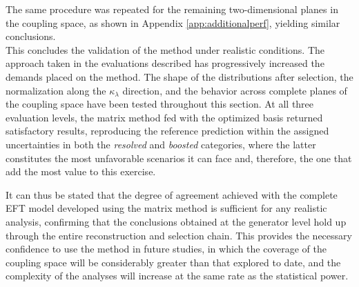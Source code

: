 The same procedure was repeated for the remaining two-dimensional planes in the coupling space, as shown in Appendix \ref{app:additionalperf}, yielding similar conclusions.\\



This concludes the validation of the method under realistic conditions. The approach taken in the evaluations described has progressively increased the demands placed on the method. The shape of the distributions after selection, the normalization along the $\kappa_\lambda$ direction, and the behavior across complete planes of the coupling space have been tested throughout this section. At all three evaluation levels, the matrix method fed with the optimized basis returned satisfactory results, reproducing the reference prediction within the assigned uncertainties in both the \textit{resolved} and \textit{boosted} categories, where the latter constitutes the most unfavorable scenarios it can face and, therefore, the one that add the most value to this exercise.

It can thus be stated that the degree of agreement achieved with the complete EFT model developed using the matrix method is sufficient for any realistic analysis, confirming that the conclusions obtained at the generator level hold up through the entire reconstruction and selection chain. This provides the necessary confidence to use the method in future studies, in which the coverage of the coupling space will be considerably greater than that explored to date, and the complexity of the analyses will increase at the same rate as the statistical power.







